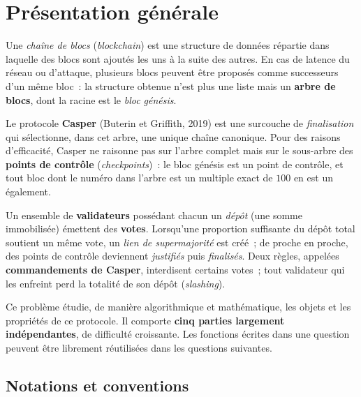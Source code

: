 \documentclass[11pt,a4paper]{article}
\begin{document}


\section*{Présentation générale}

Une \emph{chaîne de blocs} (\emph{blockchain}) est une structure de données répartie dans
laquelle des blocs sont ajoutés les uns à la suite des autres. En cas de latence du réseau
ou d'attaque, plusieurs blocs peuvent être proposés comme successeurs d'un même bloc~: la
structure obtenue n'est plus une liste mais un \textbf{arbre de blocs}, dont la racine est
le \emph{bloc génésis}.

Le protocole \textbf{Casper} (Buterin et Griffith, 2019) est une surcouche de
\emph{finalisation} qui sélectionne, dans cet arbre, une unique chaîne canonique. Pour des
raisons d'efficacité, Casper ne raisonne pas sur l'arbre complet mais sur le sous-arbre des
\textbf{points de contrôle} (\emph{checkpoints})~: le bloc génésis est un point de contrôle,
et tout bloc dont le numéro dans l'arbre est un multiple exact de $100$ en est un également.

Un ensemble de \textbf{validateurs} possédant chacun un \emph{dépôt} (une somme immobilisée)
émettent des \textbf{votes}. Lorsqu'une proportion suffisante du dépôt total soutient un
même vote, un \emph{lien de supermajorité} est créé~; de proche en proche, des points de
contrôle deviennent \emph{justifiés} puis \emph{finalisés}. Deux règles, appelées
\textbf{commandements de Casper}, interdisent certains votes~; tout validateur qui les
enfreint perd la totalité de son dépôt (\emph{slashing}).

Ce problème étudie, de manière algorithmique et mathématique, les objets et les propriétés
de ce protocole. Il comporte \textbf{cinq parties largement indépendantes}, de difficulté
croissante. Les fonctions écrites dans une question peuvent être librement réutilisées dans
les questions suivantes.

\subsection*{Notations et conventions}
\end{document}
